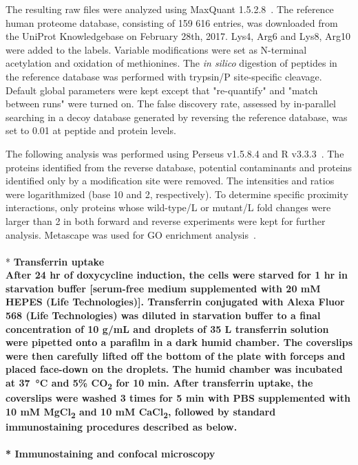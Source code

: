 The resulting raw files were analyzed using MaxQuant 1.5.2.8~\cite{Cox}. The reference human proteome database, consisting of 159 616 entries, was downloaded from the UniProt Knowledgebase on February 28th, 2017. Lys4, Arg6 and Lys8, Arg10 were added to the labels. Variable modifications were set as N-terminal acetylation and oxidation of methionines. The \textit{in silico} digestion of peptides in the reference database was performed with trypsin/P site-specific cleavage. Default global parameters were kept except that "re-quantify" and "match between runs" were turned on. The false discovery rate, assessed by in-parallel searching in a decoy database generated by reversing the reference database, was set to 0.01 at peptide and protein levels. 

The following analysis was performed using Perseus v1.5.8.4 and R v3.3.3~\cite{Tyanova}. The proteins identified from the reverse database, potential contaminants and proteins identified only by a modification site were removed. The intensities and ratios were logarithmized (base 10 and 2, respectively). To determine specific proximity interactions, only proteins whose wild-type/L or mutant/L fold changes were larger than 2 in both forward and reverse experiments were kept for further analysis. Metascape was used for GO enrichment analysis~\cite{Tripathi}.
\\
\\*
\bfseries{Transferrin uptake}\\
\normalfont After 24 hr of doxycycline induction, the cells were starved for 1 hr in starvation buffer [serum-free medium supplemented with 20 mM HEPES (Life Technologies)]. Transferrin conjugated with Alexa Fluor 568 (Life Technologies) was diluted in starvation buffer to a final concentration of 10 {}\textmu g/mL and droplets of 35 {}\textmu L transferrin solution were pipetted onto a parafilm in a dark humid chamber. The coverslips were then carefully lifted off the bottom of the plate with forceps and placed face-down on the droplets. The humid chamber was incubated at \SI{37}{\celsius} and 5\% CO\textsubscript{2} for 10 min. After transferrin uptake, the coverslips were washed 3 times for 5 min with PBS supplemented with 10 mM MgCl\textsubscript{2} and 10 mM CaCl\textsubscript{2}, followed by standard immunostaining procedures described as below.
\\
\\*
\bfseries{Immunostaining and confocal microscopy}\\
